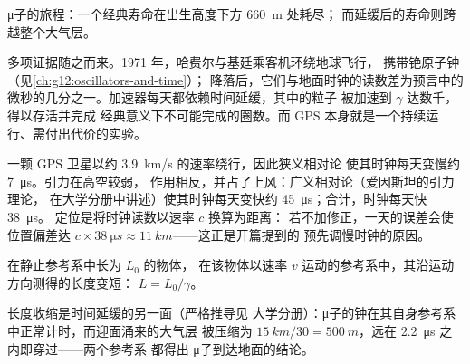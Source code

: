 \begin{omfigure}

{\small μ子的旅程：一个经典寿命在出生高度下方 \qty{660}{m} 处耗尽；
而延缓后的寿命则跨越整个大气层。}
\end{omfigure}

多项证据随之而来。1971 年，哈费尔与基廷乘客机环绕地球飞行，
携带铯原子钟（见\cref{ch:g12:oscillators-and-time}）；
降落后，它们与地面时钟的读数差为预言中的
微秒的几分之一。加速器每天都依赖时间延缓，其中的粒子
被加速到 $\gamma$ 达数千，得以存活并完成
经典意义下不可能完成的圈数。而 GPS 本身就是一个持续运行、需付出代价的实验。

\begin{remark}\label{rem:g12:special-relativity:gps}
一颗 GPS 卫星以约 \qty{3.9}{km/s} 的速率绕行，因此狭义相对论
使其时钟每天变慢约 \qty{7}{\micro s}。引力在高空较弱，
作用相反，并占了上风：广义相对论（爱因斯坦的引力理论，
在大学分册中讲述）使其时钟每天变快约
\qty{45}{\micro s}；合计，时钟每天快 \qty{38}{\micro s}。
定位是将时钟读数以速率 $c$ 换算为距离：
若不加修正，一天的误差会使位置偏差达
$c \times \qty{38}{\micro s} \approx \qty{11}{km}$——这正是开篇提到的
预先调慢时钟的原因。
\end{remark}

\begin{proposition}[长度收缩]\label{prop:g12:special-relativity:contraction}
在静止参考系中长为 $L_0$ 的物体，
在该物体以速率 $v$ 运动的参考系中，其沿运动方向测得的长度变短：
$L = L_0/\gamma$。
\end{proposition}
\admitted

\begin{remark}[μ子自身的视角]\label{rem:g12:special-relativity:muonframe}
长度收缩是时间延缓的另一面（严格推导见
大学分册）：μ子的钟在其自身参考系中正常计时，而迎面涌来的大气层
被压缩为 $\qty{15}{km}/30 =
\qty{500}{m}$，远在 \qty{2.2}{\micro s} 之内即穿过——两个参考系
都得出 μ子到达地面的结论。
\end{remark}

